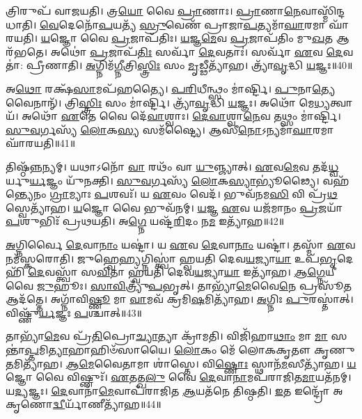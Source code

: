 𑌤𑍍𑌰𑌿𑌰𑍁𑌪᳴ 𑌵𑌾𑌜𑌯𑌤𑌿।
𑌤𑍍𑌰\-\ul{𑌯𑍋} 𑌵𑍈 \ul{𑌪𑍍𑌰𑌾}\-𑌣𑌾𑌃।
\-\ul{𑌪𑍍𑌰𑌾}\-𑌣𑌾\-\ul{𑌨𑍇}\-𑌵𑌾𑌸𑍍𑌮𑌿᳴𑌨𑍍𑌦𑌧𑌾𑌤𑌿।
\-\ul{𑌵𑍇}\-𑌦𑍇𑌨𑍋᳴\-\ul{𑌪}\-𑌯𑌤𑍍𑌯᳴ \ul{𑌸𑍍𑌰𑍁}\-𑌵𑍇𑌣᳴ 𑌪𑍍𑌰𑌾𑌜𑌾\-\ul{𑌪}\-𑌤𑍍𑌯𑌮𑌾᳴\-\ul{𑌘𑌾}\-𑌰𑌮𑌾 𑌘𑌾᳴𑌰𑌯𑌤𑌿।
\-\ul{𑌯}\-𑌜𑍍𑌞𑍋 𑌵𑍈 \ul{𑌪𑍍𑌰}\-𑌜𑌾\-𑌪᳴𑌤𑌿𑌃।
\-\ul{𑌯}\-𑌜𑍍𑌞\-\ul{𑌮𑍇}\-𑌵 \ul{𑌪𑍍𑌰}\-𑌜𑌾𑌪᳴𑌤𑌿𑌂 𑌮𑍁\-\ul{𑌖}\-𑌤 𑌆𑌰᳴𑌭𑌤𑍇।
𑌅𑌥𑍋॑ \ul{𑌪𑍍𑌰}\-𑌜𑌾\-𑌪᳴\-\ul{𑌤𑌿𑌃} 𑌸𑌰𑍍𑌵𑌾᳴ \ul{𑌦𑍇}\-𑌵𑌤𑌾𑌃॑।
𑌸𑌰𑍍𑌵𑌾᳴ \ul{𑌏}\-𑌵 \ul{𑌦𑍇}\-𑌵𑌤𑌾॑: 𑌪𑍍𑌰𑍀𑌣𑌾𑌤𑌿।
\-\ul{𑌅}\-𑌗𑍍𑌨𑌿𑌮᳴\-\ul{𑌗𑍍𑌨𑍀}\-𑌤𑍍𑌰𑌿\-\ul{𑌸𑍍𑌤𑍍𑌰𑌿𑌃} 𑌸𑌂 \ul{𑌮𑍃}\-𑌡𑍍𑌢𑍀𑌤𑍍𑌯𑌾᳴𑌹।
𑌤𑍍𑌰𑍍𑌯𑌾᳴\-\ul{𑌵𑍃}\-𑌦𑍍𑌧𑌿 \ul{𑌯}\-𑌜𑍍𑌞𑌃॥40॥

𑌅\-\ul{𑌥𑍋} 𑌰𑌕𑍍𑌷᳴\-\ul{𑌸𑌾}\-𑌮𑌪᳴𑌹𑌤𑍍𑌯𑍈।
\-\ul{𑌪}\-\-\ul{𑌰𑌿}\-𑌧𑍀𑌨𑍍𑌥𑍍𑌸𑌂 𑌮𑌾॑𑌰𑍍𑌷𑍍𑌟𑌿।
\-\ul{𑌪𑍁}\-𑌨𑌾\-\ul{𑌤𑍍𑌯𑍇}\-𑌵𑍈𑌨𑌾𑌨𑍍᳴।
𑌤𑍍𑌰𑌿\-\ul{𑌸𑍍𑌤𑍍𑌰𑌿𑌃} 𑌸𑌂 𑌮𑌾॑𑌰𑍍𑌷𑍍𑌟𑌿।
𑌤𑍍𑌰𑍍𑌯𑌾᳴\-\ul{𑌵𑍃}\-𑌦𑍍𑌧𑌿 \ul{𑌯}\-𑌜𑍍𑌞𑌃।
𑌅𑌥𑍋᳴ 𑌮𑍇\-\ul{𑌧𑍍𑌯}\-𑌤𑍍𑌵𑌾𑌯᳴।
𑌅𑌥𑍋᳴ \ul{𑌏}\-𑌤𑍇 𑌵𑍈 𑌦𑍇᳴\-\ul{𑌵𑌾}\-𑌶𑍍𑌵𑌾𑌃।
\-\ul{𑌦𑍇}\-\-\ul{𑌵𑌾}\-𑌶𑍍𑌵𑌾\-\ul{𑌨𑍇}\-𑌵 𑌤𑌥𑍍𑌸𑌂 𑌮𑌾॑𑌰𑍍𑌷𑍍𑌟𑌿।
\-\ul{𑌸𑍁}\-\-\ul{𑌵}\-𑌰𑍍𑌗𑌸𑍍𑌯᳴ \ul{𑌲𑍋}\-𑌕\-\ul{𑌸𑍍𑌯} 𑌸𑌮᳴𑌷𑍍𑌟𑍍𑌯𑍈।
𑌆𑌸𑍀᳴\-\ul{𑌨𑍋}\-\-𑌽𑌨𑍍𑌯𑌮𑌾᳴\-\ul{𑌘𑌾}\-𑌰𑌮𑌾 𑌘𑌾᳴𑌰𑌯𑌤𑌿॥41॥

𑌤𑌿𑌷𑍍𑌠᳴\-\ul{𑌨𑍍𑌨}\-𑌨𑍍𑌯𑌮𑍍।
𑌯𑌥𑌾𑌽𑌨𑍋᳴ \ul{𑌵𑌾} 𑌰𑌥𑌂᳴ 𑌵𑌾 \ul{𑌯𑍁}\-𑌞𑍍𑌜𑍍𑌯𑌾𑌤𑍍।
\-\ul{𑌏}\-𑌵\-\ul{𑌮𑍇}\-𑌵 𑌤𑌦᳴\-\ul{𑌧𑍍𑌵}\-𑌰𑍍𑌯𑍁\-\ul{𑌰𑍍𑌯}\-𑌜𑍍𑌞𑌂 𑌯𑍁᳴𑌨𑌕𑍍𑌤𑌿।
\-\ul{𑌸𑍁}\-\-\ul{𑌵}\-𑌰𑍍𑌗𑌸𑍍𑌯᳴ \ul{𑌲𑍋}\-𑌕\-\ul{𑌸𑍍𑌯𑌾}\-𑌭𑍍𑌯𑍂॑𑌢𑍍𑌯𑍈।
𑌵𑌹᳴𑌨𑍍𑌤𑍍𑌯𑍇𑌨𑌂 \ul{𑌗𑍍𑌰𑌾}\-𑌮𑍍𑌯𑌾𑌃 \ul{𑌪}\-𑌶𑌵𑌃᳴।
𑌯 \ul{𑌏}\-𑌵𑌂 𑌵𑍇𑌦᳴।
𑌭𑍁𑌵᳴𑌨𑌮\-\ul{𑌸𑌿} 𑌵𑌿 𑌪𑍍𑌰᳴\-\ul{𑌥}\-𑌸𑍍𑌵𑍇𑌤𑍍𑌯𑌾᳴𑌹।
\-\ul{𑌯}\-𑌜𑍍𑌞𑍋 𑌵𑍈 𑌭𑍁𑌵᳴𑌨𑌮𑍍।
\-\ul{𑌯}\-𑌜𑍍𑌞 \ul{𑌏}\-𑌵 𑌯𑌜᳴𑌮𑌾𑌨𑌂 \ul{𑌪𑍍𑌰}\-𑌜𑌯𑌾᳴ \ul{𑌪}\-𑌶𑍁𑌭𑌿𑌃᳴ 𑌪𑍍𑌰𑌥𑌯𑌤𑌿।
𑌅\-\ul{𑌗𑍍𑌨𑍇} 𑌯𑌷𑍍𑌟᳴\-\ul{𑌰𑌿}\-𑌦𑌂 𑌨\-\ul{𑌮} 𑌇𑌤𑍍𑌯𑌾᳴𑌹॥42॥

\-\ul{𑌅}\-𑌗𑍍𑌨𑌿𑌰𑍍𑌵𑍈 \ul{𑌦𑍇}\-𑌵𑌾\-\ul{𑌨𑌾𑌂} 𑌯𑌷𑍍𑌟𑌾॑।
𑌯 \ul{𑌏}\-𑌵 \ul{𑌦𑍇}\-𑌵𑌾\-\ul{𑌨𑌾𑌂} 𑌯𑌷𑍍𑌟𑌾॑।
𑌤𑌸𑍍𑌮𑌾᳴ \ul{𑌏}\-𑌵 𑌨𑌮᳴𑌸𑍍𑌕𑌰𑍋𑌤𑌿।
𑌜𑍁𑌹𑍍𑌵𑍇\-\ul{𑌹𑍍𑌯}\-𑌗𑍍𑌨𑌿𑌸𑍍𑌤𑍍𑌵𑌾॑ 𑌹𑍍𑌵𑌯𑌤𑌿 𑌦𑍇𑌵\-\ul{𑌯}\-𑌜𑍍𑌯𑌾\-\ul{𑌯𑌾} 𑌉𑌪᳴\-\ul{𑌭𑍃}\-𑌦𑍇𑌹𑌿᳴ \ul{𑌦𑍇}\-𑌵𑌸𑍍𑌤𑍍𑌵𑌾᳴ 𑌸\-\ul{𑌵𑌿}\-𑌤𑌾 𑌹𑍍𑌵᳴𑌯𑌤𑌿 𑌦𑍇𑌵\-\ul{𑌯}\-𑌜𑍍𑌯𑌾\-\ul{𑌯𑌾} 𑌇𑌤𑍍𑌯𑌾᳴𑌹।
\-\ul{𑌆}\-\-\ul{𑌗𑍍𑌨𑍇}\-𑌯𑍀 𑌵𑍈 \ul{𑌜𑍁}\-𑌹𑍂𑌃।
\-\ul{𑌸𑌾}\-\-\ul{𑌵𑌿}\-𑌤𑍍𑌰𑍍𑌯𑍁᳴\-\ul{𑌪}\-𑌭𑍃𑌤𑍍।
𑌤𑌾𑌭𑍍𑌯𑌾᳴\-\ul{𑌮𑍇}\-𑌵𑍈\-\ul{𑌨𑍇} 𑌪𑍍𑌰𑌸𑍂᳴\-\ul{𑌤} 𑌆𑌦᳴𑌤𑍍𑌤𑍇।
𑌅𑌗𑍍𑌨𑌾᳴𑌵𑌿\-\ul{𑌷𑍍𑌣𑍂} 𑌮𑌾 \ul{𑌵𑌾}\-𑌮𑌵᳴ 𑌕𑍍𑌰𑌮𑌿\-\ul{𑌷}\-𑌮𑌿𑌤𑍍𑌯𑌾᳴𑌹।
\-\ul{𑌅}\-𑌗𑍍𑌨𑌿𑌃 \ul{𑌪𑍁}\-𑌰𑌸𑍍𑌤𑌾॑𑌤𑍍।
𑌵𑌿𑌷𑍍𑌣𑍁᳴\-\ul{𑌰𑍍𑌯}\-𑌜𑍍𑌞𑌃 \ul{𑌪}\-𑌶𑍍𑌚𑌾𑌤𑍍॥43॥

𑌤𑌾𑌭𑍍𑌯𑌾᳴\-\ul{𑌮𑍇}\-𑌵 𑌪𑍍𑌰᳴\-\ul{𑌤𑌿}\-𑌪𑍍𑌰𑍋\-\ul{𑌚𑍍𑌯𑌾}\-𑌤𑍍𑌯𑌾 𑌕𑍍𑌰𑌾᳴𑌮𑌤𑌿।
𑌵𑌿𑌜𑌿᳴𑌹𑌾\-\ul{𑌥𑌾𑌂} 𑌮𑌾 \ul{𑌮𑌾} 𑌸𑌨𑍍𑌤𑌾॑\-\ul{𑌪𑍍𑌤}\-𑌮𑌿\-\ul{𑌤𑍍𑌯𑌾}\-𑌹𑌾𑌹𑌿𑍞᳴𑌸𑌾𑌯𑍈।
\-\ul{𑌲𑍋}\-𑌕𑌂 𑌮𑍇᳴ 𑌲𑍋𑌕𑌕𑍃𑌤𑍗 𑌕𑍃𑌣𑍁\-\ul{𑌤}\-𑌮𑌿𑌤𑍍𑌯𑌾᳴𑌹।
\-\ul{𑌆}\-\-\-\ul{𑌮𑍇}\-𑌵𑍈𑌤𑌾𑌮𑌾 𑌶𑌾॑𑌸𑍍𑌤𑍇।
𑌵𑌿\-\ul{𑌷𑍍𑌣𑍋𑌃} 𑌸𑍍𑌥𑌾𑌨᳴\-\ul{𑌮}\-𑌸𑍀𑌤𑍍𑌯𑌾᳴𑌹।
\-\ul{𑌯}\-𑌜𑍍𑌞𑍋 𑌵𑍈 𑌵𑌿𑌷𑍍𑌣𑍁𑌃᳴।
\-\ul{𑌏}\-𑌤𑌤𑍍𑌖\-\ul{𑌲𑍁} 𑌵𑍈 \ul{𑌦𑍇}\-𑌵𑌾\-\ul{𑌨𑌾}\-𑌮𑌪᳴𑌰𑌾𑌜𑌿𑌤\-\ul{𑌮𑌾}\-𑌯𑌤᳴𑌨𑌮𑍍।
𑌯\-\ul{𑌦𑍍𑌯}\-𑌜𑍍𑌞𑌃।
\-\ul{𑌦𑍇}\-𑌵𑌾𑌨𑌾᳴\-\ul{𑌮𑍇}\-𑌵𑌾𑌪᳴𑌰𑌾𑌜𑌿𑌤 \ul{𑌆}\-𑌯𑌤᳴𑌨𑍇 𑌤𑌿𑌷𑍍𑌠𑌤𑌿।
\-\ul{𑌇}\-𑌤 𑌇𑌨𑍍𑌦𑍍𑌰𑍋᳴ 𑌅𑌕𑍃𑌣𑍋\-\ul{𑌦𑍍𑌵𑍀}\-𑌰𑍍𑌯𑌾᳴\-𑌣𑍀𑌤𑍍𑌯𑌾᳴𑌹॥44॥

